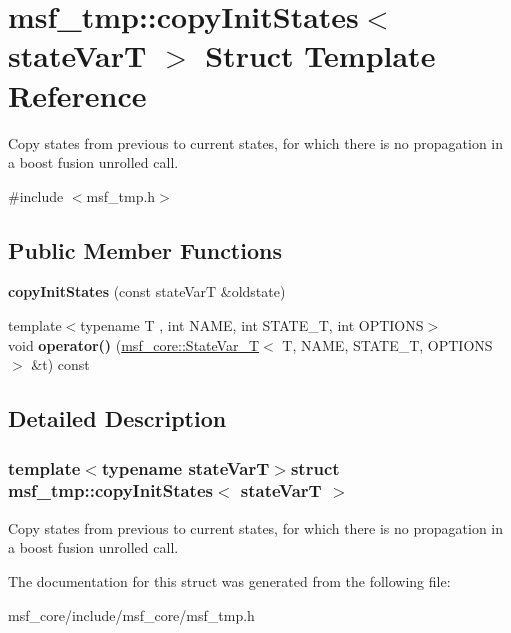 \hypertarget{structmsf__tmp_1_1copyInitStates}{\section{msf\-\_\-tmp\-:\-:copy\-Init\-States$<$ state\-Var\-T $>$ Struct Template Reference}
\label{structmsf__tmp_1_1copyInitStates}
}


Copy states from previous to current states, for which there is no propagation in a boost fusion unrolled call.  




{\ttfamily \#include $<$msf\-\_\-tmp.\-h$>$}

\subsection*{Public Member Functions}
\begin{DoxyCompactItemize}
\item 
\hypertarget{structmsf__tmp_1_1copyInitStates_af92f81a9c012c7171719098aed0e3ce7}{{\bfseries copy\-Init\-States} (const state\-Var\-T \&oldstate)}\label{structmsf__tmp_1_1copyInitStates_af92f81a9c012c7171719098aed0e3ce7}

\item 
\hypertarget{structmsf__tmp_1_1copyInitStates_a1c86ddde81da9535c1b19f19fff77ff3}{{\footnotesize template$<$typename T , int N\-A\-M\-E, int S\-T\-A\-T\-E\-\_\-\-T, int O\-P\-T\-I\-O\-N\-S$>$ }\\void {\bfseries operator()} (\hyperlink{structmsf__core_1_1StateVar__T}{msf\-\_\-core\-::\-State\-Var\-\_\-\-T}$<$ T, N\-A\-M\-E, S\-T\-A\-T\-E\-\_\-\-T, O\-P\-T\-I\-O\-N\-S $>$ \&t) const }\label{structmsf__tmp_1_1copyInitStates_a1c86ddde81da9535c1b19f19fff77ff3}

\end{DoxyCompactItemize}


\subsection{Detailed Description}
\subsubsection*{template$<$typename state\-Var\-T$>$struct msf\-\_\-tmp\-::copy\-Init\-States$<$ state\-Var\-T $>$}

Copy states from previous to current states, for which there is no propagation in a boost fusion unrolled call. 

The documentation for this struct was generated from the following file\-:\begin{DoxyCompactItemize}
\item 
msf\-\_\-core/include/msf\-\_\-core/msf\-\_\-tmp.\-h\end{DoxyCompactItemize}
